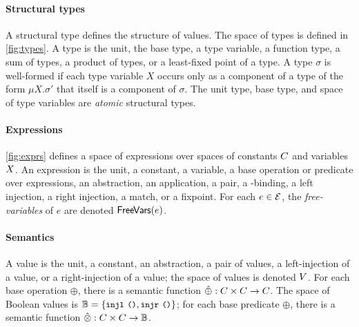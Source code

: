 \paragraph{Structural types}
%
A structural type defines the structure of values.
%
The space of types is defined in \autoref{fig:types}.
%
A type is the unit, the base type, a type variable, a function type, a
sum of types, a product of types, or a least-fixed point of a type.
%
A type $\sigma$ is well-formed if each type variable $X$ occurs only
as a component of a type of the form $\mu X. \sigma'$ that itself is a
component of $\sigma$.
%
The unit type, base type, and space of type variables are
\emph{atomic} structural types.

\paragraph{Expressions}
\autoref{fig:exprs} defines a space of expressions over spaces of
constants $C$ and variables $X$.
An expression is the unit, a constant, a variable, a base operation or
predicate over expressions, an abstraction, an application, a pair, a
-binding, a left injection, a right injection, a match, or a
fixpoint.
%
For each $e \in \mathcal{E}$, the \emph{free-variables} of $e$ are denoted
$\mathsf{FreeVars}(e)$.

\paragraph{Semantics}
%
A value is the unit, a constant, an abstraction, a pair of values, a
left-injection of a value, or a right-injection of a value;
%
the space of values is denoted $V$.
%
For each base operation $\oplus$, there is a semantic function
$\hat{\oplus} : C \times C \to C$.
%
The space of Boolean values is
$\bools = \elts{ \injl\ \cc{()}, \injr\ \cc{()}}$;
%
for each base predicate $\oplus$, there is a semantic function
$\hat{\otimes} : C \times C \to \mathbb{B}$.

